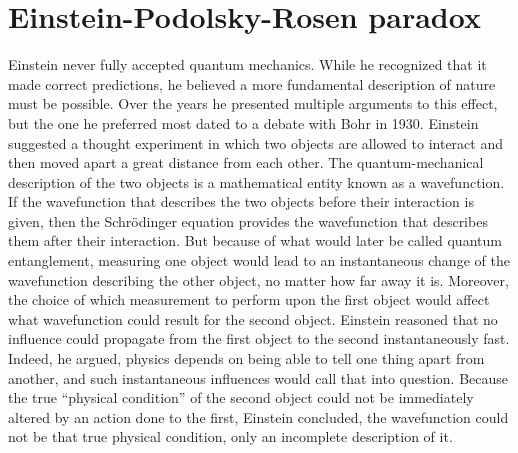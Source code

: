 \documentclass[twoside]{memoir}
\begin{document}
\section{Einstein-Podolsky-Rosen paradox}
Einstein never fully accepted quantum mechanics. While he recognized that it made correct predictions, he believed a more fundamental description of nature must be possible. Over the years he presented multiple arguments to this effect, but the one he preferred most dated to a debate with Bohr in 1930. Einstein suggested a thought experiment in which two objects are allowed to interact and then moved apart a great distance from each other. The quantum-mechanical description of the two objects is a mathematical entity known as a wavefunction. If the wavefunction that describes the two objects before their interaction is given, then the Schrödinger equation provides the wavefunction that describes them after their interaction. But because of what would later be called quantum entanglement, measuring one object would lead to an instantaneous change of the wavefunction describing the other object, no matter how far away it is. Moreover, the choice of which measurement to perform upon the first object would affect what wavefunction could result for the second object. Einstein reasoned that no influence could propagate from the first object to the second instantaneously fast. Indeed, he argued, physics depends on being able to tell one thing apart from another, and such instantaneous influences would call that into question. Because the true \enquote{physical condition} of the second object could not be immediately altered by an action done to the first, Einstein concluded, the wavefunction could not be that true physical condition, only an incomplete description of it.
\end{document}

